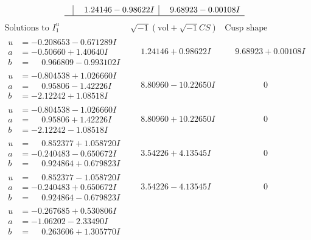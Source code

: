\documentclass[1p]{elsarticle_modified}
\theoremstyle{definition}
\newcommand{\I}{\sqrt{-1}}
\begin{document}
$$\begin{array}{c|c|c}
 & \phantom{-}1.24146 - 0.98622 I & \phantom{-}9.68923 - 0.00108 I\\
 \hline 
 \end{array}$$\newpage$$\begin{array}{c|c|c}  
\text{Solutions to }I^u_{1}& \I (\text{vol} + \sqrt{-1}CS) & \text{Cusp shape}\\
 \hline 
\begin{aligned}
u &= -0.208653 - 0.671289 I \\
a &= -0.50660 + 1.40640 I \\
b &= \phantom{-}0.966809 - 0.993102 I\end{aligned}
 & \phantom{-}1.24146 + 0.98622 I & \phantom{-}9.68923 + 0.00108 I \\ \hline\begin{aligned}
u &= -0.804538 + 1.026660 I \\
a &= \phantom{-}0.95806 - 1.42226 I \\
b &= -2.12242 + 1.08518 I\end{aligned}
 & \phantom{-}8.80960 - 10.22650 I & \phantom{-0.000000 } 0 \\ \hline\begin{aligned}
u &= -0.804538 - 1.026660 I \\
a &= \phantom{-}0.95806 + 1.42226 I \\
b &= -2.12242 - 1.08518 I\end{aligned}
 & \phantom{-}8.80960 + 10.22650 I & \phantom{-0.000000 } 0 \\ \hline\begin{aligned}
u &= \phantom{-}0.852377 + 1.058720 I \\
a &= -0.240483 - 0.650672 I \\
b &= \phantom{-}0.924864 + 0.679823 I\end{aligned}
 & \phantom{-}3.54226 + 4.13545 I & \phantom{-0.000000 } 0 \\ \hline\begin{aligned}
u &= \phantom{-}0.852377 - 1.058720 I \\
a &= -0.240483 + 0.650672 I \\
b &= \phantom{-}0.924864 - 0.679823 I\end{aligned}
 & \phantom{-}3.54226 - 4.13545 I & \phantom{-0.000000 } 0 \\ \hline\begin{aligned}
u &= -0.267685 + 0.530806 I \\
a &= -1.06202 - 2.33490 I \\
b &= \phantom{-}0.263606 + 1.305770 I\end{aligned}

\end{array}$$
\end{document}
